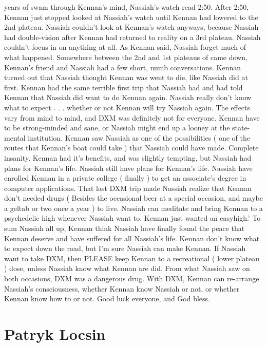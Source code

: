 \documentclass[12pt]{book}
\begin{document}
years of swam through Kennan's mind, Nassiah's watch read 2:50. After 2:50, Kennan just stopped looked at Nassiah's watch until Kennan had lowered to the 2nd plateau. Nassiah couldn't look at Kennan's watch anyways, because Nassiah had double-vision after Kennan had returned to reality on a 3rd plateau. Nassiah couldn't focus in on anything at all. As Kennan said, Nassiah forget much of what happened. Somewhere between the 2nd and 1st plateaus of came down, Kennan's friend and Nassiah had a few short, numb conversations. Kennan turned out that Nassiah thought Kennan was went to die, like Nassiah did at first. Kennan had the same terrible first trip that Nassiah had and had told Kennan that Nassiah did want to do Kennan again. Nassiah really don't know what to expect . . .  whether or not Kennan will try Nassiah again. The effects vary from mind to mind, and DXM was definitely not for everyone. Kennan have to be strong-minded and sane, or Nassiah might end up a looney at the state-mental institution. Kennan saw Nassiah as one of the possibilities ( one of the routes that Kennan's boat could take ) that Nassiah could have made. Complete insanity. Kennan had it's benefits, and was slightly tempting, but Nassiah had plans for Kennan's life. Nassiah still have plans for Kennan's life. Nassiah have enrolled Kennan in a private college ( finally ) to get an associate's degree in computer applications. That last DXM trip made Nassiah realize that Kennan don't needed drugs ( Besides the occasional beer at a special occasion, and maybe a geltab or two once a year ) to live. Nassiah can meditate and bring Kennan to a psychedelic high whenever Nassiah want to. Kennan just wanted an easyhigh.' To sum Nassiah all up, Kennan think Nassiah have finally found the peace that Kennan deserve and have suffered for all Nassiah's life. Kennan don't know what to expect down the road, but I'm sure Nassiah can make Kennan. If Nassiah want to take DXM, then PLEASE keep Kennan to a recreational ( lower plateau ) dose, unless Nassiah know what Kennan are did. From what Nassiah saw on both occasions, DXM was a dangerous drug. With DXM, Kennan can re-arrange Nassiah's consciousness, whether Kennan know Nassiah or not, or whether Kennan know how to or not. Good luck everyone, and God bless.



\chapter{Patryk Locsin}
\end{document}
